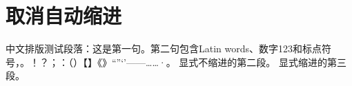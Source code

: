\documentclass[a4paper,10pt,UTF8,scheme=chinese,autoindent=false]{ctexart}
\begin{document}
\section{取消自动缩进}
中文排版测试段落：这是第一句。第二句包含Latin words、数字123和标点符号，。！？；：（）【】《》“”‘’——……·。
\noindent 显式不缩进的第二段。
\indent 显式缩进的第三段。
\end{document}
